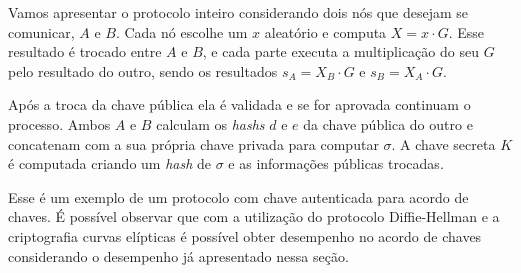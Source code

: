 Vamos apresentar o protocolo inteiro considerando dois nós que desejam se comunicar, $A$ e $B$. Cada nó escolhe um $x$ aleatório e computa $X = x \cdot G$. Esse resultado é trocado entre $A$ e $B$, e cada parte executa a multiplicação do seu $G$ pelo resultado do outro, sendo os resultados $s_A = X_B \cdot G$ e $s_B = X_A \cdot G$.

Após a troca da chave pública ela é validada e se for aprovada continuam o processo. Ambos $A$ e $B$ calculam os \textit{hashs} $d$ e $e$ da chave pública do outro e concatenam com a sua própria chave privada para computar $\sigma$. A chave secreta $K$ é computada criando um \textit{hash} de $\sigma$ e as informações públicas trocadas.

Esse é um exemplo de um protocolo com chave autenticada para acordo de chaves. É possível observar que com a utilização do protocolo Diffie-Hellman e a criptografia curvas elípticas é possível obter desempenho no acordo de chaves considerando o desempenho já apresentado nessa seção.